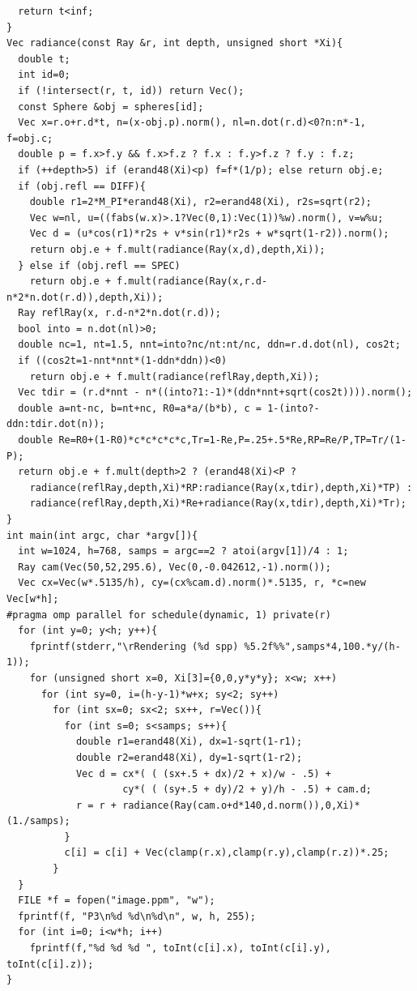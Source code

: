 \begin{verbatim}
  return t<inf; 
} 
Vec radiance(const Ray &r, int depth, unsigned short *Xi){ 
  double t;                               
  int id=0;                               
  if (!intersect(r, t, id)) return Vec(); 
  const Sphere &obj = spheres[id];        
  Vec x=r.o+r.d*t, n=(x-obj.p).norm(), nl=n.dot(r.d)<0?n:n*-1, f=obj.c; 
  double p = f.x>f.y && f.x>f.z ? f.x : f.y>f.z ? f.y : f.z; 
  if (++depth>5) if (erand48(Xi)<p) f=f*(1/p); else return obj.e; 
  if (obj.refl == DIFF){                  
    double r1=2*M_PI*erand48(Xi), r2=erand48(Xi), r2s=sqrt(r2); 
    Vec w=nl, u=((fabs(w.x)>.1?Vec(0,1):Vec(1))%w).norm(), v=w%u; 
    Vec d = (u*cos(r1)*r2s + v*sin(r1)*r2s + w*sqrt(1-r2)).norm(); 
    return obj.e + f.mult(radiance(Ray(x,d),depth,Xi)); 
  } else if (obj.refl == SPEC)            
    return obj.e + f.mult(radiance(Ray(x,r.d-n*2*n.dot(r.d)),depth,Xi)); 
  Ray reflRay(x, r.d-n*2*n.dot(r.d));     
  bool into = n.dot(nl)>0;                
  double nc=1, nt=1.5, nnt=into?nc/nt:nt/nc, ddn=r.d.dot(nl), cos2t; 
  if ((cos2t=1-nnt*nnt*(1-ddn*ddn))<0)    
    return obj.e + f.mult(radiance(reflRay,depth,Xi)); 
  Vec tdir = (r.d*nnt - n*((into?1:-1)*(ddn*nnt+sqrt(cos2t)))).norm(); 
  double a=nt-nc, b=nt+nc, R0=a*a/(b*b), c = 1-(into?-ddn:tdir.dot(n)); 
  double Re=R0+(1-R0)*c*c*c*c*c,Tr=1-Re,P=.25+.5*Re,RP=Re/P,TP=Tr/(1-P); 
  return obj.e + f.mult(depth>2 ? (erand48(Xi)<P ?   
    radiance(reflRay,depth,Xi)*RP:radiance(Ray(x,tdir),depth,Xi)*TP) : 
    radiance(reflRay,depth,Xi)*Re+radiance(Ray(x,tdir),depth,Xi)*Tr); 
} 
int main(int argc, char *argv[]){ 
  int w=1024, h=768, samps = argc==2 ? atoi(argv[1])/4 : 1; 
  Ray cam(Vec(50,52,295.6), Vec(0,-0.042612,-1).norm()); 
  Vec cx=Vec(w*.5135/h), cy=(cx%cam.d).norm()*.5135, r, *c=new Vec[w*h]; 
#pragma omp parallel for schedule(dynamic, 1) private(r)       
  for (int y=0; y<h; y++){                       
    fprintf(stderr,"\rRendering (%d spp) %5.2f%%",samps*4,100.*y/(h-1)); 
    for (unsigned short x=0, Xi[3]={0,0,y*y*y}; x<w; x++)   
      for (int sy=0, i=(h-y-1)*w+x; sy<2; sy++)     
        for (int sx=0; sx<2; sx++, r=Vec()){        
          for (int s=0; s<samps; s++){ 
            double r1=erand48(Xi), dx=1-sqrt(1-r1); 
            double r2=erand48(Xi), dy=1-sqrt(1-r2); 
            Vec d = cx*( ( (sx+.5 + dx)/2 + x)/w - .5) + 
                    cy*( ( (sy+.5 + dy)/2 + y)/h - .5) + cam.d; 
            r = r + radiance(Ray(cam.o+d*140,d.norm()),0,Xi)*(1./samps); 
          } 
          c[i] = c[i] + Vec(clamp(r.x),clamp(r.y),clamp(r.z))*.25; 
        } 
  } 
  FILE *f = fopen("image.ppm", "w");         
  fprintf(f, "P3\n%d %d\n%d\n", w, h, 255); 
  for (int i=0; i<w*h; i++) 
    fprintf(f,"%d %d %d ", toInt(c[i].x), toInt(c[i].y), toInt(c[i].z)); 
} 
\end{verbatim}
